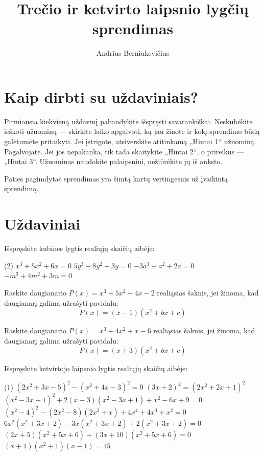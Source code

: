 \documentclass[11pt,a4paper]{scrartcl}
\title{Trečio ir ketvirto laipsnio lygčių sprendimas}
\author{Andrius Berniukevičius}
\begin{document}
\maketitle
\section*{Kaip dirbti su uždaviniais?}

Pirmiausia kiekvieną uždavinį pabandykite išspręsti savarankiškai. Neskubėkite ieškoti užuominų — skirkite laiko apgalvoti, ką jau žinote ir kokį sprendimo būdą galėtumėte pritaikyti. Jei įstrigote, atsiverskite atitinkamą „Hintai 1“ užuominą. Pagalvojate. Jei jos nepakanka, tik tada skaitykite „Hintai 2“, o prireikus — „Hintai 3“. Užuominas naudokite palaipsniui, nežiūrėkite jų iš anksto.

Paties pagimdytas sprendimas yra šimtą kartų vertingesnis už įvaikintą sprendimą.

\section{Uždaviniai}

\begin{problem}
Išspręskite kubines lygtis realiųjų skaičių aibėje:
\begin{tasks}[label={(\arabic*)}, label-offset=0.9em](2)
    \task $x^3 + 5x^2 + 6x = 0$
    \task $5y^3 - 8y^2 + 3y = 0$
    \task $-3a^3 + a^2 +2a = 0$
    \task $-m^3 + 4m^2 +3m = 0$
\end{tasks}
\end{problem}

\begin{problem}
    Raskite daugianario $P(x) = x ^{3} +5x ^{2} -4x-2$ realiąsias šaknis, jei žinoma, kad daugianarį galima užrašyti pavidalu:
     $$P(x) = (x-1)(x ^{2} +bx+c) $$    
\end{problem}

\begin{problem}
    Raskite daugianario $P(x) =x^3+4 x^2+x-6$ realiąsias šaknis, jei žinoma, kad daugianarį galima užrašyti pavidalu:
     $$P(x) = (x+3)(x ^{2} +bx+c) $$    
\end{problem}

\begin{problem}
Išspręskite ketvirtojo laipsnio lygtis realiųjų skaičių aibėje:
\begin{tasks}[label={(\arabic*)}, label-offset=0.9em](1)
    \task $(2x ^{2} +3x-5) ^{2} -(x ^{2} +4x-3) ^{2} = 0$
    \task $(3x+2) ^{2} = (2x ^{2} +2x+1) ^{2} $
    \task $(x ^{2} -3x+1) ^{2} +2(x-3)(x ^{2} -3x+1)+x ^{2} -6x+9 = 0$
    \task $(x ^{2} -4) ^{2} -(2x ^{2} -8)(2x ^{2} +x)+4x ^{4}+4x ^{3} +x ^{2} = 0 $
    \task $6x ^{2} (x ^{2} +3x+2)-3x(x ^{2} +3x+2)+ 2(x ^{2} +3x+2) = 0$
    \task $(2x+5)(x^2 + 5x + 6)+(3x+10)(x ^{2} +5x+6) = 0$ 
    \task $(x+1)(x ^{2} +1)(x-1) = 15$
\end{tasks}
\end{problem}
\end{document}

